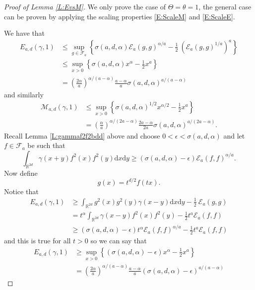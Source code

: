 \documentclass[a4paper,11pt]{article}
\numberwithin{equation}{section}
\numberwithin{equation}{section}
\theoremstyle{plain}
\theoremstyle{definition}
\newcommand{\ud}{\ensuremath{\mathrm{d} }}
\newcommand{\R}{\mathbb{R}}
\begin{document}
\begin{proof}[Proof of Lemma \ref{L:EvsM}]
  We only prove the case of $\Theta=\theta=1$, the general case can be proven by applying the scaling properties \eqref{E:ScaleM} and \eqref{E:ScaleE}.

  We have that
  \begin{align}
    E_{a,d}(\gamma,1)
    & \le \sup_{g\in \mathcal{F}_a} \left\{ \sigma(a,d,\alpha) \mathcal{E}_a(g,g)^{\alpha/a} - \frac{1}{2}\: (\mathcal{E}_a(g,g)^{1/a})^a \right\} \nonumber \\
    & \le \sup_{x>0} \left\{ \sigma(a,d,\alpha) x^\alpha - \frac{1}{2}x^a \right\} \nonumber                                                                 \\
    & = \left(\frac{2\alpha}{a}\right)^{\alpha/(a-\alpha)}\frac{a-\alpha}{a}\sigma(a,d,\alpha)^{a/(a-\alpha)}
    \label{E:Eupperbound}
  \end{align}
  and similarly
  \begin{align}
    \mathcal{M}_{a,d}(\gamma,1)
    & \le \sup_{x > 0} \left\{ \sigma(a,d,\alpha)^{1/2} x^{\alpha/2} - \frac{1}{2} x^{a} \right\} \nonumber \\
    & = \left( \frac{\alpha}{a}\right)^{\alpha/(2a-\alpha)} \frac{2a-\alpha}{2a}\sigma(a,d,\alpha)^{a/(2a-\alpha)}.
    \label{E:Mupperbound}
  \end{align}
  Recall Lemma \ref{L:gammaf2f2bdd} above and choose $0 < \epsilon < \sigma(a,d,\alpha)$ and let
  $f\in \mathcal{F}_a$ be such that
  \[
    \int_{\R^{2d}} \gamma(x+y)f^2(x)f^2(y) \ud x \ud y \ge (\sigma(a,d,\alpha)-\epsilon) \mathcal{E}_a(f,f)^{\alpha/a}.
  \]
  Now define
  \[
    g(x) = t^{d/2}f(tx).
  \]
  Notice that
  \begin{align*}
    E_{a,d}(\gamma,1)
    & \ge \int_{\R^{2d}} g^2(x)g^2(y) \gamma(x-y)\ud x\ud y - \frac{1}{2}\: \mathcal{E}_a(g,g)    \\
    & = t^\alpha \int_{\R^{2d}} \gamma(x-y) f^2(x)f^2(y) -     \frac{1}{2} t^a \mathcal{E}_a(f,f) \\
    & \ge (\sigma(a,d,\alpha)-\epsilon) t^{\alpha} \mathcal{E}_a(f,f)^{\alpha/a} - \frac{1}{2} t^a \mathcal{E}_a(f,f)
  \end{align*}
  and this is true for all $t>0$ so we can say that
  \begin{align*}
    E_{a,d}(\gamma,1)
    & \ge \sup_{x>0} \left\{ (\sigma(a,d,\alpha)-\epsilon) x^\alpha - \frac{1}{2} x^a \right\} \nonumber \\
    & = \left(\frac{2\alpha}{a}\right)^{\alpha/(a-\alpha)}\frac{a-\alpha}{a}(\sigma(a,d,\alpha)-\epsilon)^{a/(a-\alpha)}

\end{align*}
\end{proof}
\end{document}
